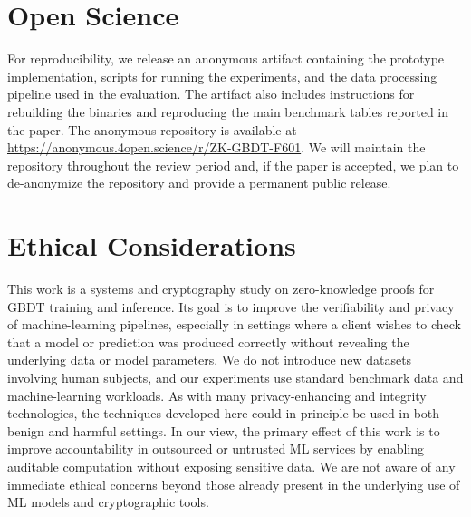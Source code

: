 \section{Open Science}\label{sec:open-science}
For reproducibility, we release an anonymous artifact containing the
prototype implementation, scripts for running the experiments, and the data
processing pipeline used in the evaluation. The artifact also includes
instructions for rebuilding the binaries and reproducing the main benchmark
tables reported in the paper. The anonymous repository is available at
\url{https://anonymous.4open.science/r/ZK-GBDT-F601}. We will
maintain the repository throughout the review period and, if the paper is
accepted, we plan to de-anonymize the repository and provide a permanent public
release.

\section{Ethical Considerations}
This work is a systems and cryptography study on zero-knowledge proofs for GBDT
training and inference. Its goal is to improve the verifiability and privacy of
machine-learning pipelines, especially in settings where a client wishes to
check that a model or prediction was produced correctly without revealing the
underlying data or model parameters. We do not introduce new datasets involving
human subjects, and our experiments use standard benchmark data and
machine-learning workloads. As with many privacy-enhancing and integrity
technologies, the techniques developed here could in principle be used in both
benign and harmful settings. In our view, the primary effect of this work is to
improve accountability in outsourced or untrusted ML services by enabling
auditable computation without exposing sensitive data. We are not aware of any
immediate ethical concerns beyond those already present in the underlying use of
ML models and cryptographic tools.
